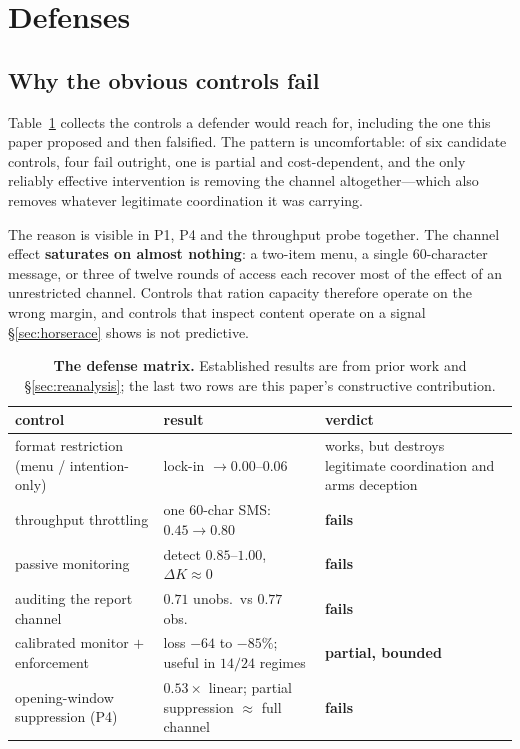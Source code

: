 \section{Defenses}
\label{sec:defense}

\subsection{Why the obvious controls fail}
\label{sec:matrix}

Table~\ref{tab:defense} collects the controls a defender would reach for, including the
one this paper proposed and then falsified. The pattern is uncomfortable: of six
candidate controls, four fail outright, one is partial and cost-dependent, and the only
reliably effective intervention is removing the channel altogether---which also removes
whatever legitimate coordination it was carrying.

The reason is visible in P1, P4 and the throughput probe together. The channel effect
\textbf{saturates on almost nothing}: a two-item menu, a single $60$-character message,
or three of twelve rounds of access each recover most of the effect of an unrestricted
channel. Controls that ration capacity therefore operate on the wrong margin, and
controls that inspect content operate on a signal \S\ref{sec:horserace} shows is not
predictive.

\begin{table}[t]
\centering
\caption{\textbf{The defense matrix.} Established results are from prior work and
\S\ref{sec:reanalysis}; the last two rows are this paper's constructive contribution.}
\label{tab:defense}
\small
\begin{tabularx}{\textwidth}{l X l}
\toprule
control & result & verdict \\
\midrule
format restriction (menu / intention-only) & lock-in $\to 0.00$--$0.06$ & works, but
destroys legitimate coordination and arms deception \\
throughput throttling & one $60$-char SMS: $0.45\!\to\!0.80$ & \textbf{fails} \\
passive monitoring & detect $0.85$--$1.00$, $\Delta K\approx0$ & \textbf{fails} \\
auditing the report channel & $0.71$ unobs.\ vs $0.77$ obs. & \textbf{fails} \\
\midrule
calibrated monitor $+$ enforcement & loss $-64$ to $-85\%$; useful in $14/24$ regimes
& \textbf{partial, bounded} \\
opening-window suppression (P4) & $0.53\times$ linear; partial suppression $\approx$
full channel & \textbf{fails} \\
\bottomrule
\end{tabularx}
\end{table}

